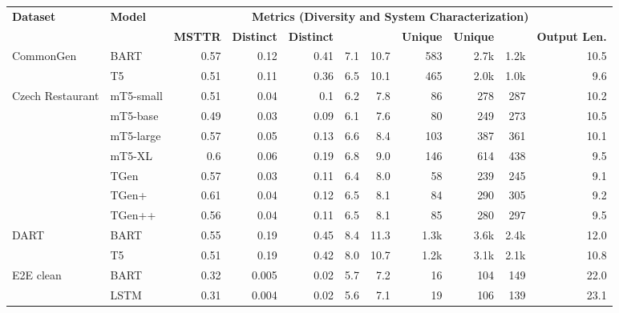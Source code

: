 \documentclass[11pt,a4paper]{article}
\begin{document}
\setlength{\tabcolsep}{4pt}\renewcommand{\arraystretch}{0.75}\begin{table*}[!htbp]
\centering
\small
\begin{tabular}{@{}llrrrrrrrrr@{}}
\toprule
\multirow{2}{*}{\textbf{Dataset}} & \multirow{2}{*}{\textbf{Model}} & \multicolumn{9}{c}{\textbf{Metrics {\fontsize{9}{10}\selectfont (Diversity and System Characterization)}}} \\ 
 &  & {\fontsize{7.5}{9}\selectfont \textbf{MSTTR}} & {\fontsize{7.5}{9}\selectfont \textbf{Distinct}} & {\fontsize{7.5}{9}\selectfont \textbf{Distinct}} & {\fontsize{7.5}{9}\selectfont \textbf{}} & {\fontsize{7.5}{9}\selectfont \textbf{}} & {\fontsize{7.5}{9}\selectfont \textbf{Unique}} & {\fontsize{7.5}{9}\selectfont \textbf{Unique}}& {\fontsize{7.5}{9}\selectfont \textbf{}} & {\fontsize{7.5}{9}\selectfont \textbf{Output Len.}} \\ \toprule
\multirow{2}{*}{CommonGen} & \small{BART} & 0.57 & 0.12 & 0.41 & 7.1 & 10.7 & 583 & 2.7k & 1.2k & 10.5 \\
 & \small{T5} & 0.51 & 0.11 & 0.36 & 6.5 & 10.1 & 465 & 2.0k & 1.0k & 9.6 \\
\midrule
\multirow{3}{*}{Czech Restaurant} & \small{mT5-small} & 0.51 & 0.04 & 0.1 & 6.2 & 7.8 & 86 & 278 & 287 & 10.2 \\
 & \small{mT5-base} & 0.49 & 0.03 & 0.09 & 6.1 & 7.6 & 80 & 249 & 273 & 10.5 \\
 & \small{mT5-large} & 0.57 & 0.05 & 0.13 & 6.6 & 8.4 & 103 & 387 & 361 & 10.1 \\
 & \small{mT5-XL} & 0.6 & 0.06 & 0.19 & 6.8 & 9.0 & 146 & 614 & 438 & 9.5 \\
 & \small{TGen} & 0.57 & 0.03 & 0.11 & 6.4 & 8.0 & 58 & 239 & 245 & 9.1 \\
 & \small{TGen+} & 0.61 & 0.04 & 0.12 & 6.5 & 8.1 & 84 & 290 & 305 & 9.2 \\
 & \small{TGen++} & 0.56 & 0.04 & 0.11 & 6.5 & 8.1 & 85 & 280 & 297 & 9.5 \\
\midrule
\multirow{2}{*}{DART} & \small{BART} & 0.55 & 0.19 & 0.45 & 8.4 & 11.3 & 1.3k & 3.6k & 2.4k & 12.0 \\
 & \small{T5} & 0.51 & 0.19 & 0.42 & 8.0 & 10.7 & 1.2k & 3.1k & 2.1k & 10.8 \\
\midrule
\multirow{4}{*}{E2E clean} & \small{BART} & 0.32 & 0.005 & 0.02 & 5.7 & 7.2 & 16 & 104 & 149 & 22.0 \\
 & \small{LSTM} & 0.31 & 0.004 & 0.02 & 5.6 & 7.1 & 19 & 106 & 139 & 23.1 \\

\end{tabular}
\end{table*}
\end{document}
